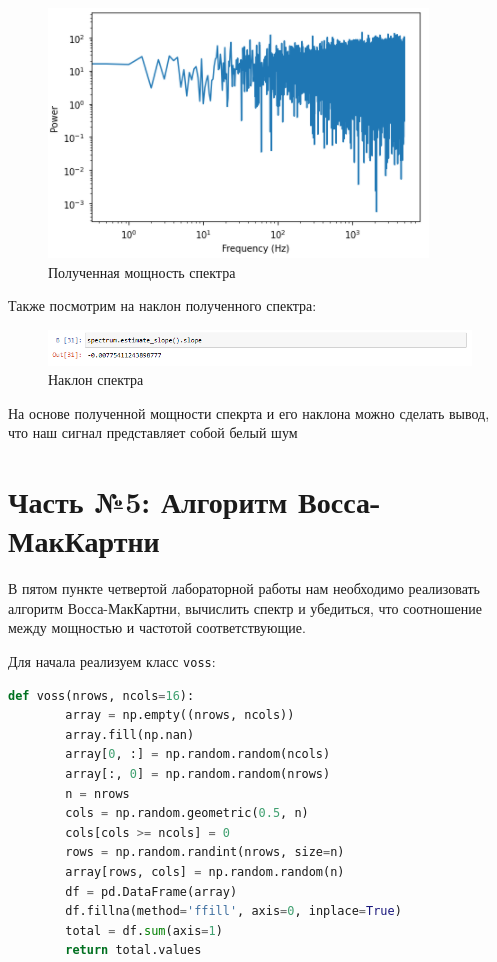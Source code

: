 \documentclass[a4paper]{article}
\begin{document}
            \begin{figure}[H]
                \centering
                \includegraphics{ex_4_signal_log_spectr.png}
                \caption{Полученная мощность спектра}
                \label{fig:ex_4_signal_log_spectr}
            \end{figure}
            
            Также посмотрим на наклон полученного спектра:
            
            \begin{figure}[H]
                \centering
                \includegraphics[width=\textwidth]{ex_4_signal_estimate_slope.png}
                \caption{Наклон спектра}
                \label{fig:ex_4_signal_estimate_slope}
            \end{figure}
            
            На основе полученной мощности спекрта и его наклона можно сделать вывод, что наш сигнал представляет собой белый шум
    
    \newpage
        \section{Часть №5: Алгоритм Восса-МакКартни}
            В пятом пункте четвертой лабораторной работы нам необходимо реализовать алгоритм Восса-МакКартни, вычислить спектр и убедиться, что соотношение между мощностью и частотой соответствующие.
            
            Для начала реализуем класс \texttt{voss}:
            
\begin{lstlisting}[language=Python, caption= Класс \texttt{voss}]
    def voss(nrows, ncols=16):
        array = np.empty((nrows, ncols))
        array.fill(np.nan)
        array[0, :] = np.random.random(ncols)
        array[:, 0] = np.random.random(nrows)
        n = nrows
        cols = np.random.geometric(0.5, n)
        cols[cols >= ncols] = 0
        rows = np.random.randint(nrows, size=n)
        array[rows, cols] = np.random.random(n)
        df = pd.DataFrame(array)
        df.fillna(method='ffill', axis=0, inplace=True)
        total = df.sum(axis=1)
        return total.values
\end{lstlisting}       
            
\end{document}

